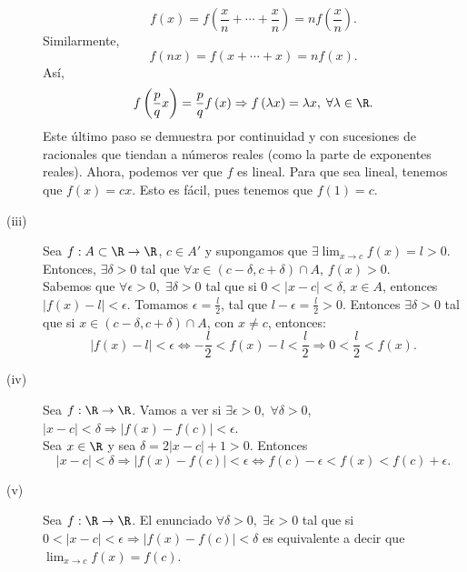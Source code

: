 \begin{eg}
\begin{description}
\[f\left(x\right) = f\left(\frac{x}{n} + \cdots + \frac{x}{n}\right) = n f\left(\frac{x}{n}\right) .\]
Similarmente, 
\[f\left(nx\right) = f\left(x+\cdots + x\right) = nf\left(x\right) .\]
Así, 
\[f\left(\frac{p}{q}x\right) = \frac{p}{q}f\left(x\right) \Rightarrow f\left(\lambda x\right)= \lambda x, \; \forall \lambda \in \R .\]
Este último paso se demuestra por continuidad y con sucesiones de racionales que tiendan a números reales (como la parte de exponentes reales). Ahora, podemos ver que $\displaystyle f $ es lineal. Para que sea lineal, tenemos que $\displaystyle f\left(x\right) = cx $. Esto es fácil, pues tenemos que $\displaystyle f\left(1\right) = c $.
\item[(iii)] Sea $\displaystyle f: A \subset \R \to \R $, $\displaystyle c \in A' $ y supongamos que $\displaystyle \exists \lim_{x \to c}f\left(x\right) = l >0 $. Entonces, $\displaystyle \exists \delta > 0 $ tal que $\displaystyle \forall x \in \left(c - \delta, c + \delta \right) \cap A $, $\displaystyle f\left(x\right) > 0 $. \\ 
Sabemos que $\displaystyle \forall \epsilon > 0, \; \exists \delta > 0 $ tal que si $\displaystyle 0 < \left|x - c\right| < \delta  $, $\displaystyle x \in A $, entonces $\displaystyle \left|f\left(x\right)-l\right|<\epsilon  $. Tomamos $\displaystyle \epsilon = \frac{l}{2} $, tal que $\displaystyle l - \epsilon = \frac{l}{2} > 0 $. Entonces $\displaystyle \exists \delta > 0 $ tal que si $\displaystyle x \in \left(c-\delta, c + \delta \right)\cap A $, con $\displaystyle x \neq c $, entonces:
\[ \left|f\left(x\right)-l\right|<\epsilon \iff -\frac{l}{2} < f\left(x\right)-l<\frac{l}{2} \Rightarrow 0 < \frac{l}{2} < f\left(x\right) .\]
\item[(iv)] Sea $\displaystyle f: \R \to \R $. Vamos a ver si $\displaystyle \exists\epsilon>0, \; \forall \delta > 0 $, $\displaystyle  \left|x - c\right| < \delta \Rightarrow \left|f\left(x\right)-f\left(c\right)\right|<\epsilon  $.\\
Sea $\displaystyle x \in \R $ y sea $\displaystyle \delta = 2 \left|x - c\right|+1 > 0 $. Entonces
\[ \left|x-c\right|<\delta \Rightarrow \left|f\left(x\right)-f\left(c\right)\right|<\epsilon \iff f\left(c\right)-\epsilon < f\left(x\right) < f\left(c\right)+\epsilon  .\]
\item[(v)] Sea $\displaystyle f: \R \to \R $. El enunciado $\displaystyle \forall \delta > 0, \;\exists \epsilon > 0  $ tal que si $\displaystyle 0 < \left|x - c\right|<\epsilon \Rightarrow \left|f\left(x\right)-f\left(c\right)\right|<\delta  $ es equivalente a decir que $\displaystyle \lim_{x \to c}f\left(x\right)=f\left(c\right) $.

\end{description}
\end{eg}
